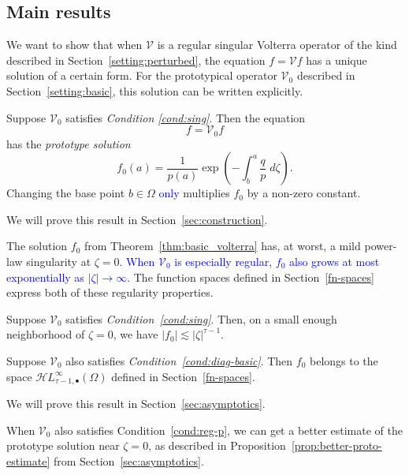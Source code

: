 \documentclass[review]{siamart220329}
\newcommand{\singexp}[2]{\mathcal{H}L^\infty_{#1, #2}}
\newcommand{\singexpalg}[1]{\singexp{#1}{\bullet}}
\newcommand{\volterra}{\mathcal{V}}
\newcommand{\hardpart}{\mathcal{V}_0}
\newcommand{\solproto}{f_0}
\newcommand{\domain}{\Omega}
\begin{document}
\subsection{Main results}\label{sec:results}
We want to show that when $\volterra$ is a regular singular Volterra operator of the kind described in Section~\ref{setting:perturbed}, the equation $f = \volterra f$ has a unique solution of a certain form. For the prototypical operator $\hardpart$ described in Section~\ref{setting:basic}, this solution can be written explicitly.
\begin{theorem}\label{thm:basic_volterra}
Suppose $\hardpart$ satisfies {\em Condition \eqref{cond:sing}}. Then the equation
\begin{equation}\label{eq:hardpart}
f = \hardpart f    
\end{equation}
has the {\em prototype solution}
\begin{equation}\label{eqn:test_solution}
\solproto(a) = \frac{1}{p(a)} \exp\left(-\int_{b}^{a}\frac{q}{p}\;d\zeta\right).
\end{equation}
Changing the base point $b \in \domain$ \textcolor{blue}{only} multiplies $f_0$ by a non-zero constant.
\end{theorem}
We will prove this result in Section~\ref{sec:construction}.

The solution $\solproto$ from Theorem~\ref{thm:basic_volterra} has, at worst, a mild power-law singularity at $\zeta = 0$. \textcolor{blue}{When $\hardpart$ is especially regular, $\solproto$ also grows at most exponentially as $|\zeta| \to \infty$.} The function spaces defined in Section~\ref{fn-spaces} express both of these regularity properties.
\begin{theorem}\label{thm:proto-growth}
Suppose $\hardpart$ satisfies {\em Condition~\eqref{cond:sing}}. Then, on a small enough neighborhood of $\zeta = 0$, we have $|\solproto| \lesssim |\zeta|^{\tau-1}$.

Suppose $\hardpart$ also satisfies {\em Condition~\eqref{cond:diag-basic}}. Then $f_0$ belongs to the space $\singexpalg{\tau-1}(\domain)$ defined in Section~\ref{fn-spaces}.
\end{theorem}
We will prove this result in Section~\ref{sec:asymptotics}.
\begin{rmk}
When $\hardpart$ also satisfies Condition~\eqref{cond:reg-p}, we can get a better estimate of the prototype solution near $\zeta = 0$, as described in Proposition~\ref{prop:better-proto-estimate} from Section~\ref{sec:asymptotics}.
\end{rmk}
\end{document}
